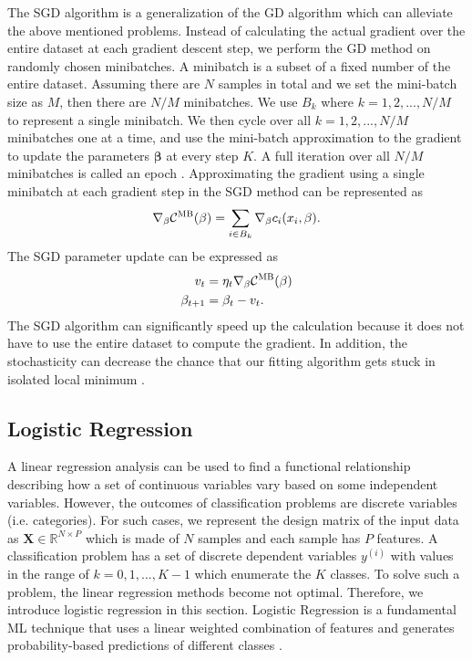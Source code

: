 \documentclass[a4paper]{article}
\begin{document}
The SGD algorithm is a generalization of the GD algorithm which can alleviate the above mentioned problems. Instead of calculating the actual gradient over the entire dataset at each gradient descent step, we perform the GD method on randomly chosen minibatches. A minibatch is a subset of a fixed number of the entire dataset. Assuming there are $N$ samples in total and we set the mini-batch size as $M$, then there are $N/M$ minibatches. We use $B_k$ where $k=1,2,...,N/M$ to represent a single minibatch. We then cycle over all $k=1,2,...,N/M$ minibatches one at a time, and use the mini-batch approximation to the gradient to update the parameters $\boldsymbol{\beta}$ at every step $K$. A full iteration over all $N/M$ minibatches is called an epoch \cite{Pankaj}. Approximating the gradient using a single minibatch at each gradient step in the SGD method can be represented as
\begin{align}
    \nabla_\beta \mathcal{C}^{\textsc{MB}}(\beta) = \sum_{i \in B_k} \nabla_\beta c_i(x_i,\beta).
\end{align}
The SGD parameter update can be expressed as
\begin{align}
    v_{t} &= \eta_t \nabla_\beta \mathcal{C}^{\textsc{MB}}(\beta)\nonumber \\
    \beta_{t+1} &= \beta_t - v_{t}.
\end{align}
The SGD algorithm can significantly speed up the calculation because it does not have to use the entire dataset to compute the gradient. In addition, the stochasticity can decrease the chance that our fitting algorithm gets stuck in isolated local minimum \cite{Pankaj}. 

\subsection{Logistic Regression}
A linear regression analysis can be used to find a functional relationship describing how a set of continuous variables vary based on some independent variables. However, the outcomes of classification problems are discrete variables (i.e. categories). For such cases, we represent the design matrix of the input data as $\mathbf{X}\in\mathbb{R}^{N\times P}$ which is made of $N$ samples and each sample has $P$ features. A classification problem has a set of discrete dependent variables ${y}^{(i)}$ with values in the range of $k=0,1,...,K-1$ which enumerate the $K$ classes. To solve such a problem, the linear regression methods become not optimal. Therefore, we introduce logistic regression in this section. Logistic Regression is a fundamental ML technique that uses a linear weighted combination of features and generates probability-based predictions of different classes \cite{CNTKB}. 
\end{document}
